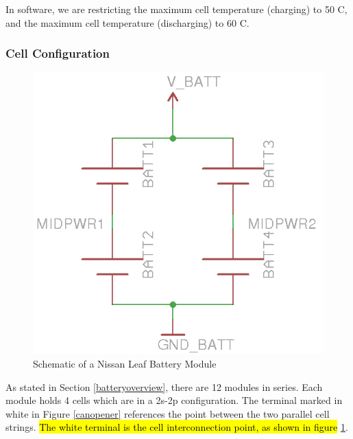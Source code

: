 \documentclass{article}
\DeclareRobustCommand{\hlr}[1]{{\sethlcolor{red}\hl{#1}}}
\begin{document}
   In software, we are restricting the maximum cell temperature (charging) to 50 \degree C, and the maximum cell temperature (discharging) to 60 \degree C.

        \subsubsection{Cell Configuration} \label{cellconfiguration}


            \begin{figure}[H]
            \centering
            \includegraphics{moduleschem}
            \caption{Schematic of a Nissan Leaf Battery Module}
            \label{module}
            \end{figure}

            As stated in Section \ref{batteryoverview}, there are 12 modules in series. Each module holds 4 cells which are in a 2s-2p configuration. The terminal marked in white in Figure \ref{canopener} references the point between the two parallel cell strings. \hlr{The white terminal is the cell interconnection point, as shown in figure} \ref{module}.
\end{document}
